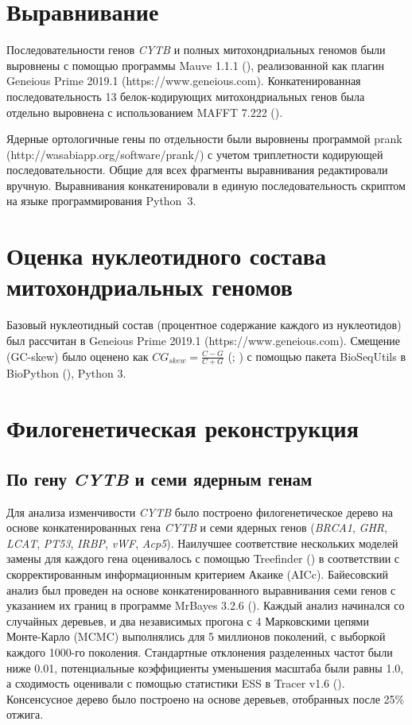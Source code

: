 \section{Выравнивание}

Последовательности генов \textit{CYTB} и полных митохондриальных геномов были выровнены с помощью программы Mauve 1.1.1 (\cite{Darling2004}), реализованной как плагин Geneious Prime 2019.1 (https://www.geneious.com). Конкатенированная последовательность 13 белок-кодирующих митохондриальных генов была отдельно выровнена с использованием MAFFT 7.222 (\cite{Katoh2014}).

Ядерные ортологичные гены по отдельности были выровнены программой prank (http://wasabiapp.org/software/prank/) с учетом триплетности кодирующей последовательности. Общие для всех фрагменты выравнивания редактировали вручную. Выравнивания конкатенировали в единую последовательность скриптом на языке программирования Python~3.

\section{Оценка нуклеотидного состава митохондриальных геномов}

Базовый нуклеотидный состав (процентное содержание каждого из нуклеотидов) был рассчитан в Geneious Prime 2019.1 (https://www.geneious.com). Смещение (GC-skew) было оценено как $CG_{skew} = \frac{C - G}{C + G}$ (\cite{Arabi2010}; \cite{Hassanin2005}) с помощью пакета BioSeqUtils в BioPython (\cite{Cock2009}), Python 3.   

\section{Филогенетическая реконструкция}

\subsection{По гену \textit{CYTB} и семи ядерным генам}

Для анализа изменчивости \textit{CYTB} было построено филогенетическое дерево на основе конкатенированных гена \textit{CYTB} и семи ядерных генов (\textit{BRCA1}, \textit{GHR}, \textit{LCAT}, \textit{PT53}, \textit{IRBP}, \textit{vWF}, \textit{Acp5}). Наилучшее соответствие нескольких моделей замены для каждого гена оценивалось с помощью Treefinder (\cite{Jobb2004}) в соответствии с скорректированным информационным критерием Акаике (AICc). Байесовский анализ был проведен на основе конкатенированного выравнивания семи генов с указанием их границ в программе MrBayes 3.2.6 (\cite{Ronquist2012}). Каждый анализ начинался со случайных деревьев, и два независимых прогона с 4 Марковскими цепями Монте-Карло (MCMC) выполнялись для 5 миллионов поколений, с выборкой каждого 1000-го поколения. Стандартные отклонения разделенных частот были ниже 0.01, потенциальные коэффициенты уменьшения масштаба были равны 1.0, а сходимость оценивали с помощью статистики ESS в Tracer v1.6 (\cite{Rambaut2014}). Консенсусное дерево было построено на основе деревьев, отобранных после 25\% отжига.

